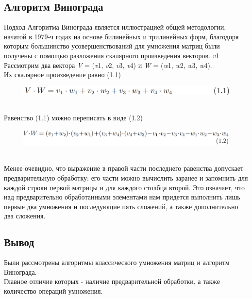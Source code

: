 \documentclass[a4paper, 12pt]{article}
\begin{document}
\begin{flushleft}
	\subsection{Алгоритм Винограда}
	\hspace*{5mm} Подход Алгоритма Винограда является иллюстрацией общей методологии, начатой в 1979-ч годах на основе билинейных и трилинейных форм, благодоря которым большинство усовершенствований для умножения матриц были получены с помощью разложения скалярного произведения векторов. {\it v}1
	\\ \hspace*{5mm} Рассмотрим два вектора {\it V} = ({\it v}1, {\it v}2, {\it v}3, {\it v}4) и {\it W} = ({\it w}1, {\it w}2, {\it w}3, {\it w}4). 
	\\ \hspace*{5mm} Их скалярное произведение равно (1.1)
	\begin{figure}[h]
		\centering
		\includegraphics[scale=0.8]{formula2}
	\end{figure}
	\\ \hspace*{5mm} Равенство (1.1) можно переписать в виде (1.2)
	\begin{figure}[h]
		\includegraphics[scale=0.8]{formula3}
	\end{figure}
	\\ \hspace*{5mm} Менее очевидно, что выражение в правой части последнего равенства допускает предварительную обработку: его части можно вычислить заранее и запомнить для каждой строки первой матрицы и для каждого столбца второй. Это означает, что над предварительно обработанными элементами нам придется выполнить лишь первые два умножения и последующие пять сложений, а также дополнительно два сложения.
	\subsection{Вывод}
	\hspace*{5mm} Были рассмотрены алгоритмы классического умножения матриц и алгоритм Винограда.\cite{mulAlg} \\Главное отличие которых - наличие предварительной обработки, а также количество операций умножения.
\end{flushleft}
\end{document}

